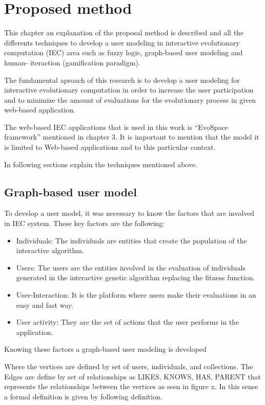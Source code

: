 \chapter{Proposed method}

This chapter an explanation of the proposal method is described and all the
differents techniques to develop a user modeling in interactive evolutionary
computation (IEC) area such as fuzzy logic, graph-based user modeling and human-
iteraction  (gamification paradigm).

The fundamental aproach of this research is to develop a user modeling for
interactive evolutionary computation in order to increase the user participation
and to minimize the amount of evaluations for the evolutionary process in given
web-based application.

The web-based IEC applications that is used in this work is “EvoSpace framework”
mentioned in chapter 3. It is important to mention that the model it is limited
to Web-based applications and to this particular context.

In following sections explain the techniques mentioned above.


\section{Graph-based user model} 

To develop a user model, it was necessary to know the factors that are involved in
IEC system. These key factors are the following:

\begin{itemize} 
\item Individuals: The individuals are entities that create the population
of the interactive algorithm.  
\item Users: The users are the entities 
involved in the evaluation of individuals generated in the interactive genetic
algorithm replacing the fitness function.
\item User-Interaction: It is the platform where users make their evaluations in an 
easy and fast way.
\item User activity: They are the set of actions that the user performs in the application. 
\end{itemize}


Knowing these factors a graph-based user modeling is developed 

Where the vertices are defined by set of users, individuals, and
collections. The Edges are define by set of relationships as LIKES, KNOWS, HAS, PARENT that represents the relationships between the vertices as seen in figure x. In this sense a formal definition is given by following definition.


